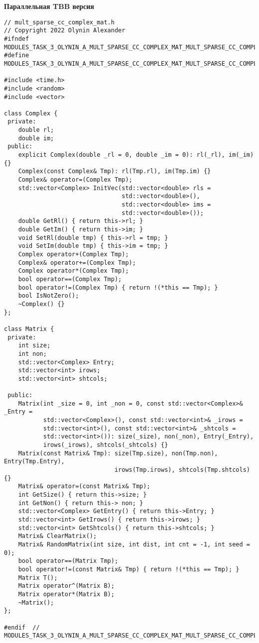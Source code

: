 \documentclass[12pt]{report}
\begin{document}
\textbf{Параллельная TBB версия}
\begin{lstlisting}
// mult_sparse_cc_complex_mat.h
// Copyright 2022 Olynin Alexander
#ifndef MODULES_TASK_3_OLYNIN_A_MULT_SPARSE_CC_COMPLEX_MAT_MULT_SPARSE_CC_COMPLEX_MAT_H_
#define MODULES_TASK_3_OLYNIN_A_MULT_SPARSE_CC_COMPLEX_MAT_MULT_SPARSE_CC_COMPLEX_MAT_H_

#include <time.h>
#include <random>
#include <vector>

class Complex {
 private:
    double rl;
    double im;
 public:
    explicit Complex(double _rl = 0, double _im = 0): rl(_rl), im(_im) {}
    Complex(const Complex& Tmp): rl(Tmp.rl), im(Tmp.im) {}
    Complex& operator=(Complex Tmp);
    std::vector<Complex> InitVec(std::vector<double> rls =
                                 std::vector<double>(),
                                 std::vector<double> ims =
                                 std::vector<double>());
    double GetRl() { return this->rl; }
    double GetIm() { return this->im; }
    void SetRl(double tmp) { this->rl = tmp; }
    void SetIm(double tmp) { this->im = tmp; }
    Complex operator+(Complex Tmp);
    Complex& operator+=(Complex Tmp);
    Complex operator*(Complex Tmp);
    bool operator==(Complex Tmp);
    bool operator!=(Complex Tmp) { return !(*this == Tmp); }
    bool IsNotZero();
    ~Complex() {}
};

class Matrix {
 private:
    int size;
    int non;
    std::vector<Complex> Entry;
    std::vector<int> irows;
    std::vector<int> shtcols;

 public:
    Matrix(int _size = 0, int _non = 0, const std::vector<Complex>& _Entry =
           std::vector<Complex>(), const std::vector<int>& _irows =
           std::vector<int>(), const std::vector<int>& _shtcols =
           std::vector<int>()): size(_size), non(_non), Entry(_Entry),
           irows(_irows), shtcols(_shtcols) {}
    Matrix(const Matrix& Tmp): size(Tmp.size), non(Tmp.non), Entry(Tmp.Entry),
                               irows(Tmp.irows), shtcols(Tmp.shtcols) {}
    Matrix& operator=(const Matrix& Tmp);
    int GetSize() { return this->size; }
    int GetNon() { return this-> non; }
    std::vector<Complex> GetEntry() { return this->Entry; }
    std::vector<int> GetIrows() { return this->irows; }
    std::vector<int> GetShtcols() { return this->shtcols; }
    Matrix& ClearMatrix();
    Matrix& RandomMatrix(int size, int dist, int cnt = -1, int seed = 0);
    bool operator==(Matrix Tmp);
    bool operator!=(const Matrix& Tmp) { return !(*this == Tmp); }
    Matrix T();
    Matrix operator^(Matrix B);
    Matrix operator*(Matrix B);
    ~Matrix();
};

#endif  // MODULES_TASK_3_OLYNIN_A_MULT_SPARSE_CC_COMPLEX_MAT_MULT_SPARSE_CC_COMPLEX_MAT_H_

\end{lstlisting}
\end{document}

